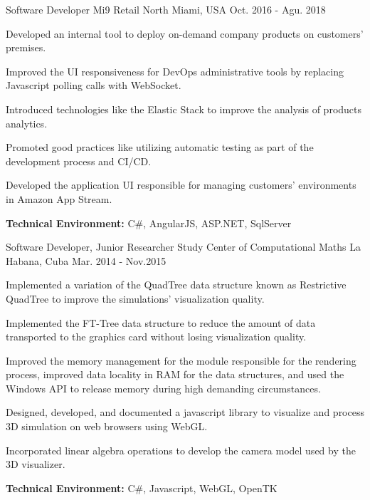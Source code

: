 \begin{cventries}
\workexperienceentry
{Software Developer} %
{Mi9 Retail} %
{North Miami, USA} %
{Oct. 2016 - Agu. 2018} %
{ %
\begin{cvitems}
    \item {Developed an internal tool to deploy on-demand company products on customers' premises.}
    \item {Improved the UI responsiveness for DevOps administrative tools by replacing Javascript polling calls with WebSocket.}
    \item {Introduced technologies like the Elastic Stack to improve the analysis of products analytics.}  
    \item {Promoted good practices like utilizing automatic testing as part of the development process and CI/CD.}
    \item {Developed the application UI responsible for managing customers' environments in Amazon App Stream.}
\end{cvitems}
}
{\textbf{Technical Environment:} C\#, AngularJS, ASP.NET, SqlServer}


\workexperienceentry
{Software Developer, Junior Researcher} %
{Study Center of Computational Maths} %
{La Habana, Cuba} %
{Mar. 2014 - Nov.2015} %
{ %
\begin{cvitems}
	\item {Implemented a variation of the QuadTree data structure known as Restrictive QuadTree to improve the simulations' visualization quality.}
	\item {Implemented the FT-Tree data structure to reduce the amount of data transported to the graphics card without losing visualization quality.}
	\item {Improved the memory management for the module responsible for the rendering process, improved data locality in RAM for the data structures, and used the Windows API to release memory during high demanding circumstances.}
	\item {Designed, developed, and documented a javascript library to visualize and process 3D simulation on web browsers
	using WebGL.}
	\item {Incorporated linear algebra operations to develop the camera model used by the 3D visualizer.}
\end{cvitems}
}
{\textbf{Technical Environment:} C\#, Javascript, WebGL, OpenTK}
\end{cventries}